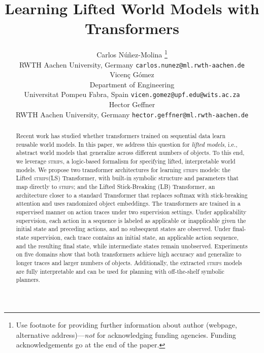 \documentclass{article} %
\title{Learning Lifted World Models with Transformers}
\author{Carlos Núñez-Molina \thanks{ Use footnote for providing further information
about author (webpage, alternative address)---\emph{not} for acknowledging
funding agencies.  Funding acknowledgements go at the end of the paper.} \\
RWTH Aachen University, Germany
\texttt{carlos.nunez@ml.rwth-aachen.de} \\
\And
Vicenç Gómez\\
Department of Engineering\\
Universitat Pompeu Fabra, Spain
\texttt{vicen.gomez@upf.edu@wits.ac.za} \\
\AND
Hector Geffner \\
RWTH Aachen University, Germany
\texttt{hector.geffner@ml.rwth-aachen.de}
}
\theoremstyle{definition}
\newcommand{\strips}{\textsc{strips}\xspace}
\begin{document}
\maketitle

\begin{abstract}
Recent work has studied whether transformers trained on sequential data learn reusable world models.
In this paper, we address this question for \textit{lifted models}, i.e., abstract world models that generalize across different numbers of objects.
To this end, we leverage \strips, a logic-based formalism for specifying lifted, interpretable world models.
We propose two transformer architectures for learning \strips models:
the Lifted \strips (LS) Transformer, with built-in symbolic structure and parameters that map directly to \strips;
and the Lifted Stick-Breaking (LB) Transformer, an architecture closer to a standard Transformer that replaces softmax with stick-breaking attention and uses randomized object embeddings.
The transformers are trained in a supervised manner on action traces under two supervision settings.
Under applicability supervision, each action in a sequence is labeled as applicable or inapplicable given the initial state and preceding actions, and no subsequent states are observed.
Under final-state supervision, each trace contains an initial state, an applicable action sequence, and the resulting final state, while intermediate states remain unobserved.
Experiments on five domains show that both transformers achieve high accuracy and generalize to longer traces and larger numbers of objects.
Additionally, the extracted \strips models are fully interpretable and can be used for planning with off-the-shelf symbolic planners.
\end{abstract}
\end{document}
